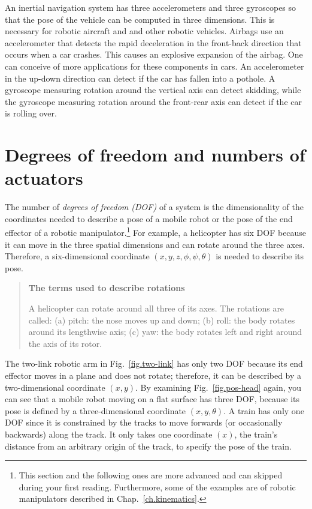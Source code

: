 An inertial navigation system has three accelerometers and three gyroscopes so that the pose of the vehicle can be computed in three dimensions. This is necessary for robotic aircraft and and other robotic vehicles. Airbags use an accelerometer that detects the rapid deceleration in the front-back direction that occurs when a car crashes. This causes an explosive expansion of the airbag. One can conceive of more applications for these components in cars. An accelerometer in the up-down direction can detect if the car has fallen into a pothole. A gyroscope measuring rotation around the vertical axis can detect skidding, while the gyroscope measuring rotation around the front-rear axis can detect if the car is rolling over.


\section{Degrees of freedom and numbers of actuators}\label{s.dof}

The number of \emph{degrees of freedom (DOF)} of a system is the dimensionality of the coordinates needed to describe a pose of a mobile robot or the pose of the end effector of a robotic manipulator.\footnote{This section and the following ones are more advanced and can skipped during your first reading. Furthermore, some of the examples are of robotic manipulators described in Chap.~\ref{ch.kinematics}.} For example, a helicopter has six DOF because it can move in the three spatial dimensions and can rotate around the three axes. Therefore, a six-dimensional coordinate $(x,y,z,\phi,\psi,\theta)$ is needed to describe its pose.

\begin{quote}
\begin{center}
\textbf{The terms used to describe rotations}
\end{center}
A helicopter can rotate around all three of its axes. The rotations are called: (a) pitch: the nose moves up and down; (b) roll: the body rotates around its lengthwise axis; (c) yaw: the body rotates left and right around the axis of its rotor.
\end{quote}

The two-link robotic arm in Fig.~\ref{fig.two-link} has only two DOF because its end effector moves in a plane and does not rotate; therefore, it can be described by a two-dimensional coordinate $(x,y)$. By examining Fig.~\ref{fig.pos-head} again, you can see that a mobile robot moving on a flat surface has three DOF, because its pose is defined by a three-dimensional coordinate $(x,y,\theta)$. A train has only one DOF since it is constrained by the tracks to move forwards (or occasionally backwards) along the track. It only takes one coordinate $(x)$, the train's distance from an arbitrary origin of the track, to specify the pose of the train.

